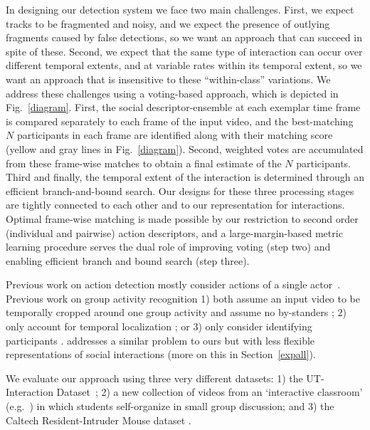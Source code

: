 In designing our detection system we face two main challenges. First, we expect tracks to be fragmented and noisy, and we expect the presence of outlying fragments caused by false detections, so we want an approach that can succeed in spite of these. Second, we expect that the same type of interaction can occur over different temporal extents, and at variable rates within its temporal extent, so we want an approach that is insensitive to these ``within-class'' variations. We address these challenges using a voting-based approach, which is depicted in Fig.~\ref{diagram}. First, the social descriptor-ensemble at each exemplar time frame is compared separately to each frame of the input video, and the best-matching $N$ participants in each frame are identified along with their matching score (yellow and gray lines in Fig.~\ref{diagram}). Second, weighted votes are accumulated from these frame-wise matches to obtain a final estimate of the $N$ participants. Third and finally, the temporal extent of the interaction is determined through an efficient branch-and-bound search. Our designs for these three processing stages are tightly connected to each other and to our representation for interactions. Optimal frame-wise matching is made possible by our restriction to second order (individual and pairwise) action descriptors, and a large-margin-based metric learning procedure serves the dual role of improving voting (step two) and enabling efficient branch and bound search (step three).

Previous work on action detection mostly consider actions of a single actor~\cite{Ke:detection,Yuan:detection,Shechtman:detection,Hu:detection,Laptev:detection,Duchenne:detection}. Previous work on group activity recognition 1) both assume an input video to be temporally cropped around one group activity and assume no by-standers \cite{Intille:act,Ni:group,Lan:Group}; 2) only account for temporal localization \cite{Hongeng:act,Gong:act,Hakeem:act,McCowan:meeting,Choi:recogtrack,Vlad:group, Ryoo:group, CRIM13}; or 3) only consider identifying participants \cite{Li:segmentation,Cristani:discovery}. \cite{Amer:group}  addresses a similar problem to ours but with less flexible representations of social interactions (more on this in Section~\ref{expall}). 

We evaluate our approach using three very different datasets: 1) the UT-Interaction Dataset~\cite{Ryoo:group}; 2) a new collection of videos from an `interactive classroom' (e.g.~\cite{Crouch:PI}) in which students self-organize in small group discussion; and 3) the Caltech Resident-Intruder Mouse dataset \cite{CRIM13}.



